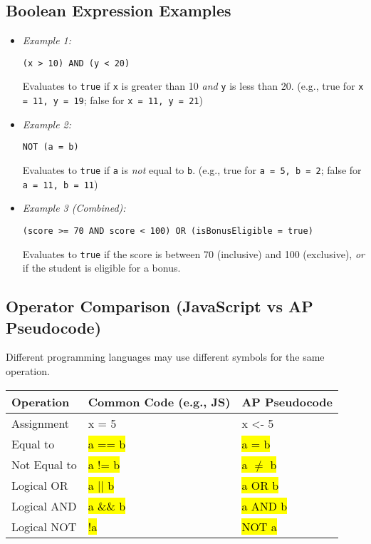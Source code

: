 \documentclass[11pt,oneside]{book}
\newcommand{\hlc}[2][hlyellow]{\sethlcolor{#1}\hl{#2}}
\begin{document}
\subsection*{Boolean Expression Examples}
\begin{itemize}
    \item \textit{Example 1:}
    \begin{lstlisting}[language={}, basicstyle=\ttfamily\small]
    (x > 10) AND (y < 20)
    \end{lstlisting}
    Evaluates to \texttt{true} if \texttt{x} is greater than 10 \textit{and} \texttt{y} is less than 20. (e.g., true for \texttt{x = 11, y = 19}; false for \texttt{x = 11, y = 21})
    \item \textit{Example 2:}
    \begin{lstlisting}[language={}, basicstyle=\ttfamily\small]
    NOT (a = b)
    \end{lstlisting}
    Evaluates to \texttt{true} if \texttt{a} is \textit{not} equal to \texttt{b}. (e.g., true for \texttt{a = 5, b = 2}; false for \texttt{a = 11, b = 11})
    \item \textit{Example 3 (Combined):}
    \begin{lstlisting}[language={}, basicstyle=\ttfamily\small]
    (score >= 70 AND score < 100) OR (isBonusEligible = true)
    \end{lstlisting}
    Evaluates to \texttt{true} if the score is between 70 (inclusive) and 100 (exclusive), \textit{or} if the student is eligible for a bonus.
\end{itemize}

\subsection*{Operator Comparison (JavaScript vs AP Pseudocode)}
Different programming languages may use different symbols for the same operation.

\begin{tabularx}{\textwidth}{l >{\ttfamily}l >{\ttfamily}l}
\toprule
\textbf{Operation} & \textbf{Common Code (e.g., JS)} & \textbf{AP Pseudocode} \\
\midrule
Assignment & x = 5 & x <- 5 \\
Equal to & \hlc[hlyellow]{a == b} & \hlc[hlyellow]{a = b} \\
Not Equal to & \hlc[hlyellow]{a != b} & \hlc[hlyellow]{a $\neq$ b} \\
Logical OR & \hlc[hlred]{a || b} & \hlc[hlred]{a OR b} \\
Logical AND & \hlc[hlred]{a \&\& b} & \hlc[hlred]{a AND b} \\
Logical NOT & \hlc[hlred]{!a} & \hlc[hlred]{NOT a} \\
\bottomrule
\end{tabularx}
\end{document}
